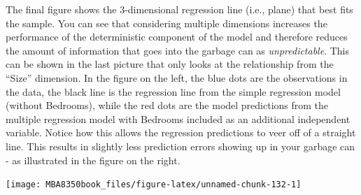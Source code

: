 \documentclass[
]{book}
\newenvironment{Shaded}{\begin{snugshade}}{\end{snugshade}}
\newcommand{\AttributeTok}[1]{\textcolor[rgb]{0.77,0.63,0.00}{#1}}
\newcommand{\DecValTok}[1]{\textcolor[rgb]{0.00,0.00,0.81}{#1}}
\newcommand{\FunctionTok}[1]{\textcolor[rgb]{0.00,0.00,0.00}{#1}}
\newcommand{\NormalTok}[1]{#1}
\newcommand{\SpecialCharTok}[1]{\textcolor[rgb]{0.00,0.00,0.00}{#1}}
\newcommand{\StringTok}[1]{\textcolor[rgb]{0.31,0.60,0.02}{#1}}
\begin{document}
The final figure shows the 3-dimensional regression line (i.e., plane) that best fits the sample. You can see that considering multiple dimensions increases the performance of the deterministic component of the model and therefore reduces the amount of information that goes into the garbage can as \emph{unpredictable}. This can be shown in the last picture that only looks at the relationship from the ``Size'' dimension. In the figure on the left, the blue dots are the observations in the data, the black line is the regression line from the simple regression model (without Bedrooms), while the red dots are the model predictions from the multiple regression model with Bedrooms included as an additional independent variable. Notice how this allows the regression predictions to veer off of a straight line. This results in slightly less prediction errors showing up in your garbage can - as illustrated in the figure on the right.

\begin{center}\texttt{[image: MBA8350book\_files/figure-latex/unnamed-chunk-132-1]} \end{center}

\begin{Shaded}
\end{Shaded}
\end{document}

